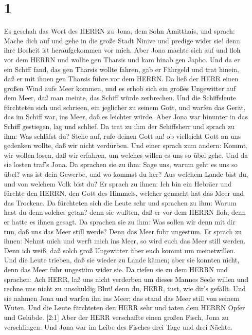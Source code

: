 \hypertarget{section}{%
\section{1}\label{section}}

 Es geschah das Wort des HERRN zu Jona, dem Sohn Amitthais,
und sprach:  Mache dich auf und gehe in die große Stadt
Ninive und predige wider sie! denn ihre Bosheit ist heraufgekommen vor
mich.  Aber Jona machte sich auf und floh vor dem HERRN und
wollte gen Tharsis und kam hinab gen Japho. Und da er ein Schiff fand,
das gen Tharsis wollte fahren, gab er Fährgeld und trat hinein, daß er
mit ihnen gen Tharsis führe vor dem HERRN.  Da ließ der HERR
einen großen Wind aufs Meer kommen, und es erhob sich ein großes
Ungewitter auf dem Meer, daß man meinte, das Schiff würde zerbrechen.
 Und die Schiffsleute fürchteten sich und schrieen, ein
jeglicher zu seinem Gott, und warfen das Gerät, das im Schiff war, ins
Meer, daß es leichter würde. Aber Jona war hinunter in das Schiff
gestiegen, lag und schlief.  Da trat zu ihm der Schiffsherr
und sprach zu ihm: Was schläfst du? Stehe auf, rufe deinen Gott an! ob
vielleicht Gott an uns gedenken wollte, daß wir nicht verdürben.
 Und einer sprach zum andern: Kommt, wir wollen losen, daß
wir erfahren, um welches willen es uns so übel gehe. Und da sie losten
traf's Jona.  Da sprachen sie zu ihm: Sage uns, warum geht
es uns so übel? was ist dein Gewerbe, und wo kommst du her? Aus welchem
Lande bist du, und von welchem Volk bist du?  Er sprach zu
ihnen: Ich bin ein Hebräer und fürchte den HERRN, den Gott des Himmels,
welcher gemacht hat das Meer und das Trockene.  Da
fürchteten sich die Leute sehr und sprachen zu ihm: Warum hast du denn
solches getan? denn sie wußten, daß er vor dem HERRN floh; denn er hatte
es ihnen gesagt.  Da sprachen sie zu ihm: Was sollen wir
denn mit dir tun, daß uns das Meer still werde? Denn das Meer fuhr
ungestüm.  Er sprach zu ihnen: Nehmt mich und werft mich
ins Meer, so wird euch das Meer still werden. Denn ich weiß, daß solch
groß Ungewitter über euch kommt um meinetwillen.  Und die
Leute trieben, daß sie wieder zu Lande kämen; aber sie konnten nicht,
denn das Meer fuhr ungestüm wider sie.  Da riefen sie zu
dem HERRN und sprachen: Ach HERR, laß uns nicht verderben um dieses
Mannes Seele willen und rechne uns nicht zu unschuldig Blut! denn du,
HERR, tust, wie dir's gefällt.  Und sie nahmen Jona und
warfen ihn ins Meer; das stand das Meer still von seinem Wüten.
 Und die Leute fürchteten den HERR sehr und taten dem HERRN
Opfer und Gelübde.  {[}2:1{]} Aber der HERR verschaffte
einen großen Fisch, Jona zu verschlingen. Und Jona war im Leibe des
Fisches drei Tage und drei Nächte.

